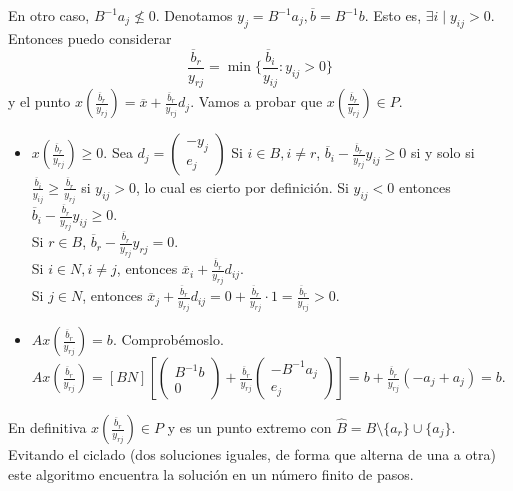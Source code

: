 \documentclass[PM.tex]{subfiles}
\begin{document}
En otro caso, $B^{-1}a_j\not\leq 0$. Denotamos $y_j=B^{-1}a_j, \overline{b}=B^{-1}b$. Esto es, $\exists i\mid y_{ij}>0$. Entonces puedo considerar 
\[
\frac{\overline{b}_r}{y_{rj}}=\min\{\frac{\overline{b}_i}{y_{ij}}:y_{ij}>0\}
\]
y el punto $x(\frac{\overline{b}_r}{y_{rj}})=\overline{x}+\frac{\overline{b}_r}{y_{rj}}d_j$. Vamos a probar que $x(\frac{\overline{b}_r}{y_{rj}})\in P$.
\begin{itemize}
\item $x(\frac{\overline{b}_r}{y_{rj}})\geq 0$. Sea $d_j=\begin{pmatrix}
-y_j\\
e_j
\end{pmatrix}$ Si $i\in B, i\neq r$, $\overline{b}_i-\frac{\overline{b}_r}{y_{rj}}y_{ij}\geq 0$ si y solo si $\frac{\overline{b}_i}{y_{ij}}\geq\frac{\overline{b}_r}{y_{rj}}$ si $y_{ij}>0$, lo cual es cierto por definición. Si $y_{ij}<0$ entonces $\overline{b}_i-\frac{\overline{b}_r}{y_{rj}}y_{ij}\geq 0$.\\
Si $r\in B$, $\overline{b}_r-\frac{\overline{b}_r}{y_{rj}}y_{rj}=0$.\\
Si $i\in N, i\neq j$, entonces $\overline{x}_i+\frac{\overline{b}_r}{y_{rj}}d_{ij}$.\\
Si $j\in N$, entonces $\overline{x}_j+\frac{\overline{b}_r}{y_{rj}}d_{ij}=0+\frac{\overline{b}_r}{y_{rj}}\cdot 1=\frac{\overline{b}_r}{y_{rj}}>0$.

\item $Ax(\frac{\overline{b}_r}{y_{rj}})=b$. Comprobémoslo. $Ax(\frac{\overline{b}_r}{y_{rj}})=[B N]\left[\begin{pmatrix}
B^{-1}b\\
0
\end{pmatrix}+\frac{\overline{b}_r}{y_{rj}}\begin{pmatrix}
-B^{-1}a_j\\
e_j
\end{pmatrix}\right]=b+\frac{\overline{b}_r}{y_{rj}}(-a_j+a_j)=b$.
\end{itemize}
En definitiva $x(\frac{\overline{b}_r}{y_{rj}})\in P$ y es un punto extremo con $\hat{B}=B\setminus\{a_r\}\cup\{a_j\}$. Evitando el ciclado (dos soluciones iguales, de forma que alterna de una a otra) este algoritmo encuentra la solución en un número finito de pasos.
\end{document}
